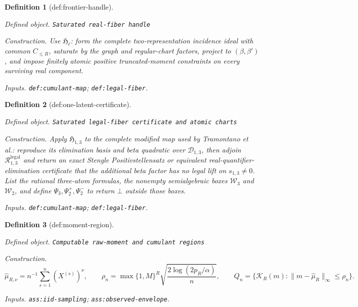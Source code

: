 \documentclass{article}
\newtheorem{definition}{Definition}
\begin{document}
\begin{definition}[def:frontier-handle]\label{def:frontier-handle}
\par\smallskip\noindent\emph{Defined object.} \texttt{Saturated real-\allowbreak{}fiber handle}
\par\smallskip\noindent\emph{Construction.} Use \(\mathfrak H_{\ell}\): form the complete two-representation incidence ideal with common \(C_{\le R}\), saturate by the graph and regular-chart factors, project to \((\beta,\beta')\), and impose finitely atomic positive truncated-moment constraints on every surviving real component.
\par\smallskip\noindent\emph{Inputs.} \texttt{def:\allowbreak{}cumulant-\allowbreak{}map}; \texttt{def:\allowbreak{}legal-\allowbreak{}fiber}.
\end{definition}

\begin{definition}[def:one-latent-certificate]\label{def:one-latent-certificate}
\par\smallskip\noindent\emph{Defined object.} \texttt{Saturated legal-\allowbreak{}fiber certificate and atomic charts}
\par\smallskip\noindent\emph{Construction.} Apply \(\mathfrak H_{1,3}\) to the complete modified map used by Tramontano et al.: reproduce its elimination basis and beta quadratic over \(\mathcal D_{1,3}\), then adjoin \(\mathcal R^{\mathrm{legal}}_{1,3}\) and return an exact Stengle Positivstellensatz or equivalent real-quantifier-elimination certificate that the additional beta factor has no legal lift on \(s_{1,3}\ne0\). List the rational three-atom formulas, the nonempty semialgebraic boxes \(\mathcal W_3\) and \(\mathcal W_2\), and define \(\Psi_3,\Psi_2^{+},\Psi_2^{-}\) to return \(\bot\) outside those boxes.
\par\smallskip\noindent\emph{Inputs.} \texttt{def:\allowbreak{}cumulant-\allowbreak{}map}; \texttt{def:\allowbreak{}legal-\allowbreak{}fiber}.
\end{definition}

\begin{definition}[def:moment-region]\label{def:moment-region}
\par\smallskip\noindent\emph{Defined object.} \texttt{Computable raw-\allowbreak{}moment and cumulant regions}
\par\smallskip\noindent\emph{Construction.} \[\widehat\mu_{R,\nu}=n^{-1}\sum_{s=1}^n(X^{(s)})^{\nu},\qquad \rho_n=\max\{1,M\}^{R}\sqrt{\frac{2\log(2p_R/\alpha)}{n}},\qquad Q_n=\{\mathcal K_R(m):\lVert m-\widehat\mu_R\rVert_{\infty}\le\rho_n\}.\]
\par\smallskip\noindent\emph{Inputs.} \texttt{ass:\allowbreak{}iid-\allowbreak{}sampling}; \texttt{ass:\allowbreak{}observed-\allowbreak{}envelope}.
\end{definition}
\end{document}
